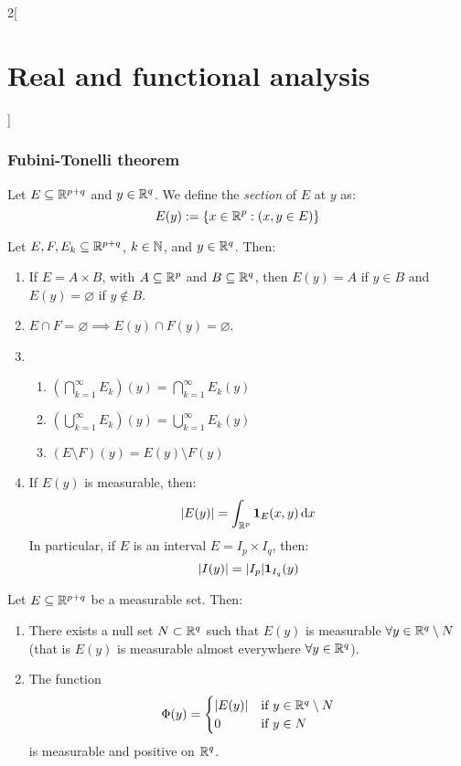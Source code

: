 \documentclass[../../../main_math.tex]{subfiles}
\begin{document}
\begin{multicols}{2}[\section{Real and functional analysis}]
  \subsubsection{Fubini-Tonelli theorem}
  \begin{definition}
    Let $E\subseteq\mathbb{R}^{p+q}$ and $y\in\mathbb{R}^q$. We define the \emph{section} of $E$ at $y$ as: $$E(y):=\{x\in\mathbb{R}^p:(x,y\in E)\}$$
  \end{definition}
  \begin{proposition}
    Let $E,F,E_k\subseteq\mathbb{R}^{p+q}$, $k\in\mathbb{N}$, and $y\in\mathbb{R}^q$. Then:
    \begin{enumerate}
      \item If $E= A\times B$, with $A\subseteq \mathbb{R}^p$ and $B\subseteq \mathbb{R}^q$, then $E(y)=A$ if $y\in B$ and $E(y)=\varnothing$ if $y\notin B$.
      \item $E\cap F=\varnothing\implies E(y)\cap F(y)=\varnothing$.
      \item \hfill\begin{enumerate}
              \item $\displaystyle\left(\bigcap_{k=1}^\infty E_k\right)(y)=\bigcap_{k=1}^\infty E_k(y)$
              \item $\displaystyle\left(\bigcup_{k=1}^\infty E_k\right)(y)=\bigcup_{k=1}^\infty E_k(y)$
              \item $\displaystyle\left(E\setminus F\right)(y)=E(y)\setminus F(y)$
            \end{enumerate}
      \item If $E(y)$ is measurable, then: $$\m{E(y)}=\int_{\RR^p}\indi{E}(x,y)\dd{x}$$ In particular, if $E$ is an interval $E=I_p\times I_q$, then: $$\m{I(y)}=\m{I_p}\indi{I_q}(y)$$
    \end{enumerate}
  \end{proposition}
  \begin{lemma}
    Let $E\subseteq\mathbb{R}^{p+q}$ be a measurable set. Then:
    \begin{enumerate}
      \item There exists a null set $N\subset \mathbb{R}^q$ such that $E(y)$ is measurable $\forall y\in\mathbb{R}^q\setminus N$ (that is $E(y)$ is measurable almost everywhere $\forall y\in\mathbb{R}^q$).
      \item The function $$\Phi(y)=\begin{cases}
                \m{E(y)} & \text{if } y\in\RR^q\setminus N \\
                0        & \text{if } y\in N
              \end{cases}$$ is measurable and positive on $\mathbb{R}^q$.

\end{enumerate}
\end{lemma}
\end{multicols}
\end{document}

